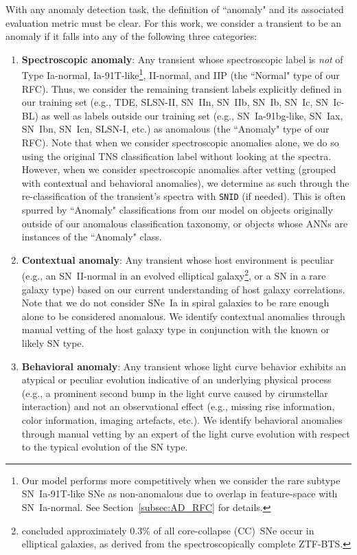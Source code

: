 \documentclass[twocolumn]{aastex63}
\begin{document}
With any anomaly detection task, the definition of ``anomaly" and its associated evaluation metric must be clear. For this work, we consider a transient to be an anomaly if it falls into any of the following three categories:
\begin{enumerate}
    \item \textbf{Spectroscopic anomaly}: Any transient whose spectroscopic label is \textit{not} of Type Ia-normal, Ia-91T-like\footnote{Our model performs more competitively when we consider the rare subtype SN~Ia-91T-like SNe as non-anomalous due to overlap in feature-space with SN~Ia-normal. See Section~\ref{subsec:AD_RFC} for details.}, II-normal, and IIP (the ``Normal" type of our RFC). Thus, we consider the remaining transient labels explicitly defined in our training set (e.g., TDE, SLSN-II, SN~IIn, SN~IIb, SN~Ib, SN~Ic, SN~Ic-BL) as well as labels outside our training set (e.g., SN~Ia-91bg-like, SN~Iax, SN~Ibn, SN~Icn, SLSN-I, etc.) as anomalous (the ``Anomaly" type of our RFC). Note that when we consider spectroscopic anomalies alone, we do so using the original TNS classification label without looking at the spectra. However, when we consider spectroscopic anomalies after vetting (grouped with contextual and behavioral anomalies), we determine as such through the re-classification of the transient's spectra with \texttt{SNID} \citep{Blondin2007} (if needed). This is often spurred by ``Anomaly" classifications from our model on objects originally outside of our anomalous classification taxonomy, or objects whose ANNs are instances of the ``Anomaly" class. \par
    \item \textbf{Contextual anomaly}: Any transient whose host environment is peculiar (e.g., an SN~II-normal in an evolved elliptical galaxy\footnote{\cite{Irani2022} concluded approximately 0.3\% of all core-collapse (CC)~SNe occur in elliptical galaxies, as derived from the spectroscopically complete ZTF-BTS.}, or a SN in a rare galaxy type) based on our current understanding of host galaxy correlations. Note that we do not consider SNe~Ia in spiral galaxies to be rare enough alone to be considered anomalous. We identify contextual anomalies through manual vetting of the host galaxy type in conjunction with the known or likely SN type. \par
    \item \textbf{Behavioral anomaly}: Any transient whose light curve behavior exhibits an atypical or peculiar evolution indicative of an underlying physical process (e.g., a prominent second bump in the light curve caused by cirumstellar interaction) and not an observational effect (e.g., missing rise information, color information, imaging artefacts, etc.). We identify behavioral anomalies through manual vetting by an expert of the light curve evolution with respect to the typical evolution of the SN type. \par
\end{enumerate}
\end{document}
